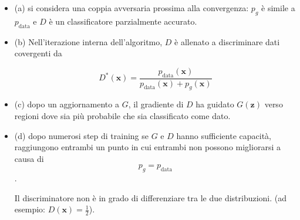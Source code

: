 \begin{itemize}
\item (a) si considera una coppia avversaria prossima alla convergenza: $p_g$ è simile a $p_\text{data}$ e
$D$ è un classificatore parzialmente accurato.

\item (b) Nell'iterazione interna dell'algoritmo, $D$ è allenato a discriminare dati covergenti da 

\[D^*(\bm{x}) = 
\frac{
    p_\text{data}(\bm{x})
    }{
        p_\text{data}(\bm{x}) + p_g(\bm{x})}
\]
 
\item (c) dopo un aggiornamento a $G$, il gradiente di $D$ ha guidato $G(\bm{z})$ verso regioni dove sia più probabile che sia classificato come dato.

\item (d) dopo numerosi step di training se $G$ e $D$ hanno sufficiente capacità, raggiungono entrambi un punto in cui entrambi non possono migliorarsi a causa di 
\[p_g = p_\text{data}\].

Il discriminatore non è in grado di differenziare tra le due distribuzioni. (ad esempio: $D(\bm{x}) = \frac{1}{2}$).
\end{itemize}


